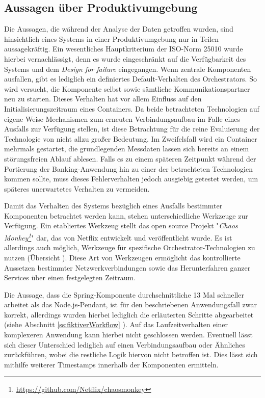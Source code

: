 \subsection{Aussagen über Produktivumgebung}
Die Aussagen, die während der Analyse der Daten getroffen wurden, sind hinsichtlich eines Systems in einer Produktivumgebung nur in Teilen aussagekräftig. Ein wesentliches Hauptkriterium der ISO-Norm 25010 wurde hierbei vernachlässigt, denn es wurde eingeschränkt auf die Verfügbarkeit des Systems und dem \emph{Design for failure} eingegangen. Wenn zentrale Komponenten ausfallen, gibt es lediglich ein definiertes Default-Verhalten des Orchestrators. So wird versucht, die Komponente selbst sowie sämtliche Kommunikationspartner neu zu starten. Dieses Verhalten hat vor allem Einfluss auf den Initialisierungszeitraum eines Containers. Da beide betrachteten Technologien auf eigene Weise Mechanismen zum erneuten Verbindungsaufbau im Falle eines Ausfalls zur Verfügung stellen, ist diese Betrachtung für die reine Evaluierung der Technologie von nicht allzu großer Bedeutung. Im Zweifelsfall wird ein Container mehrmals gestartet, die grundlegenden Messdaten lassen sich bereits an einem störungsfreien Ablauf ablesen. Falls es zu einem späteren Zeitpunkt während der Portierung der Banking-Anwendung hin zu einer der betrachteten Technologien kommen sollte, muss dieses Fehlerverhalten jedoch ausgiebig getestet werden, um späteres unerwartetes Verhalten zu vermeiden. 

Damit das Verhalten des Systems bezüglich eines Ausfalls bestimmter Komponenten betrachtet werden kann, stehen unterschiedliche Werkzeuge zur Verfügung. Ein etabliertes Werkzeug stellt das open source Projekt "\emph{Chaos Monkey\footnote{\url{https://github.com/Netflix/chaosmonkey}}}" dar, das von Netflix entwickelt und veröffentlicht wurde. Es ist allerdings auch möglich, Werkzeuge für spezifische Orchestrator-Technologien zu nutzen (Übersicht \cite[Seite~369]{continuous-delivery}). Diese Art von Werkzeugen ermöglicht das kontrollierte Aussetzen bestimmter Netzwerkverbindungen sowie das Herunterfahren ganzer Services über einen festgelegten Zeitraum. 

Die Aussage, dass die Spring-Komponente durchschnittliche 13 Mal schneller arbeitet als das Node.js-Pendant, ist für den beschriebenen Anwendungsfall zwar korrekt, allerdings wurden hierbei lediglich die erläuterten Schritte abgearbeitet (siehe Abschnitt \ref{ss:fiktiverWorkflow} ). Auf das Laufzeitverhalten einer komplexeren Anwendung kann hierbei nicht geschlossen werden. Eventuell lässt sich dieser Unterschied lediglich auf einen Verbindungsaufbau oder Ähnliches zurückführen, wobei die restliche Logik hiervon nicht betroffen ist. Dies lässt sich mithilfe weiterer Timestamps innerhalb der Komponenten ermitteln.

